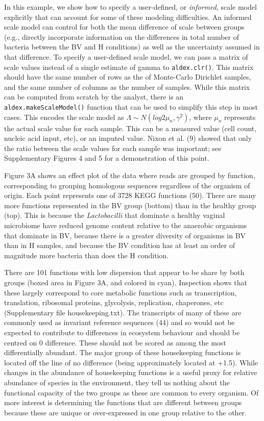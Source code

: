 \documentclass[
]{article}
\begin{document}
In this example, we show how to specify a user-defined, or
\emph{informed}, scale model explicitly that can account for some of
these modeling difficulties. An informed scale model can control for
both the mean difference of scale between groups (e.g., directly
incorporate information on the differences in total number of bacteria
between the BV and H conditions) as well as the uncertainty assumed in
that difference. To specify a user-defined scale model, we can pass a
matrix of scale values instead of a single estimate of gamma to
\texttt{aldex.clr()}. This matrix should have the same number of rows as
the of Monte-Carlo Dirichlet samples, and the same number of columns as
the number of samples. While this matrix can be computed from scratch by
the analyst, there is an \texttt{aldex.makeScaleModel()} function that
can be used to simplify this step in most cases. This encodes the scale
model as \(\Lambda \sim N(log2 \mu_n, \gamma^{2})\), where \(\mu_n\)
represents the actual scale value for each sample. This can be a
measured value (cell count, nucleic acid input, etc), or an imputed
value. Nixon et al. (9) showed that only the ratio between the scale
values for each sample was important; see Supplementary Figures 4 and 5
for a demonstration of this point.

Figure 3A shows an effect plot of the data where reads are grouped by
function, corresponding to grouping homologous sequences regardless of
the organism of origin. Each point represents one of 3728 KEGG functions
(50). There are many more functions represented in the BV group (bottom)
than in the healthy group (top). This is because the
\textit{Lactobacilli} that dominate a healthy vaginal microbiome have
reduced genome content relative to the anaerobic organisms that dominate
in BV, because there is a greater diversity of organisms in BV than in H
samples, and because the BV condition has at least an order of magnitude
more bacteria than does the H condition.

There are 101 functions with low dispersion that appear to be share by
both groups (boxed area in Figure 3A, and colored in cyan). Inspection
shows that these largely correspond to core metabolic functions such as
transcription, translation, ribosomal proteins, glycolysis, replication,
chaperones, etc (Supplementary file housekeeping.txt). The transcripts
of many of these are commonly used as invariant reference sequences (44)
and so would not be expected to contribute to differences in ecosystem
behaviour and should be centred on 0 difference. These should not be
scored as among the most differentially abundant. The major group of
these housekeeping functions is located off the line of no difference
(being approximately located at +1.5). While changes in the abundance of
housekeeping functions is a useful proxy for relative abundance of
species in the environment, they tell us nothing about the functional
capacity of the two groups as these are common to every organism. Of
more interest is determining the functions that are different between
groups because these are unique or over-expressed in one group relative
to the other.
\end{document}
